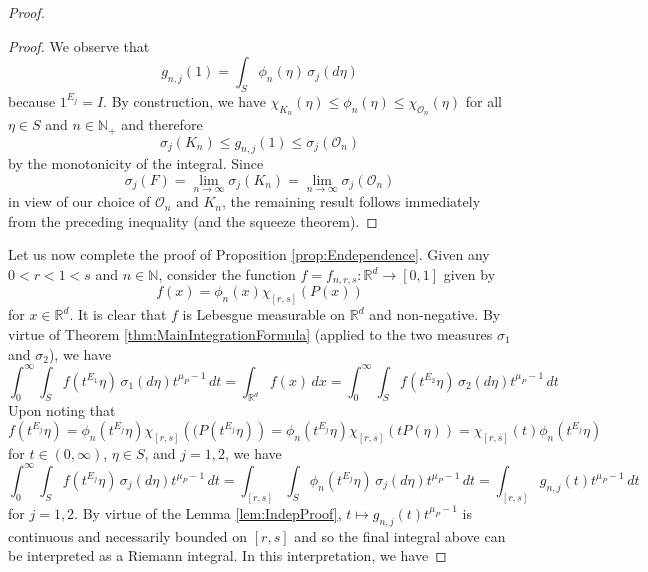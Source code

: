 \documentclass[11pt]{article}
\newcommand*{\myproofname}{Proof}
\newenvironment{subproof}[1][\myproofname]{\begin{proof}[#1]\renewcommand*{\qedsymbol}{$\mathbin{/\mkern-6mu/}$}}{\end{proof}}
\begin{document}
\begin{proof}
\begin{subproof}
We observe that
\begin{equation*}
g_{n,j}(1)=\int_{S}\phi_n(\eta)\,\sigma_j(d\eta)
\end{equation*}
because $1^{E_j}=I$. By construction, we have $\chi_{K_n}(\eta)\leq\phi_{n}(\eta)\leq \chi_{\mathcal{O}_n}(\eta)$ for all $\eta\in S$ and $n\in\mathbb{N}_+$ and therefore
\begin{equation*}
\sigma_j(K_n)\leq g_{n,j}(1)\leq \sigma_{j}(\mathcal{O}_n)
\end{equation*}
by the monotonicity of the integral. Since
\begin{equation*}
\sigma_j(F)=\lim_{n\to\infty}\sigma_j(K_n)=\lim_{n\to\infty}\sigma_j(\mathcal{O}_n)
\end{equation*}
in view of our choice of $\mathcal{O}_n$ and $K_n$, the remaining result follows immediately from the preceding inequality (and the squeeze theorem).
\end{subproof}
\noindent Let us now complete the proof of Proposition \ref{prop:Endependence}. Given any $0<r<1< s$ and $n\in\mathbb{N}$, consider the function $f=f_{n,r,s}:\mathbb{R}^d\to [0,1]$ given by
\begin{equation*}
f(x)=\phi_n(x)\chi_{[r,s]}(P(x))
\end{equation*}
for $x\in\mathbb{R}^d$. It is clear that $f$ is Lebesgue measurable on $\mathbb{R}^d$ and non-negative. By virtue of Theorem \ref{thm:MainIntegrationFormula} (applied to the two measures $\sigma_1$ and $\sigma_2$), we have
\begin{equation}\label{eq:SameMeasure1}
\int_0^\infty \int_Sf(t^{E_1}\eta)\,\sigma_1(d\eta)t^{\mu_P-1}\,dt=\int_{\mathbb{R}^d}f(x)\,dx=\int_0^\infty \int_Sf(t^{E_2}\eta)\,\sigma_2(d\eta)t^{\mu_P-1}\,dt
\end{equation}
Upon noting that
\begin{equation*}
f(t^{E_j}\eta)=\phi_n(t^{E_j}\eta)\chi_{[r,s]}\left((P(t^{E_j}\eta)\right)=\phi_n(t^{E_j}\eta)\chi_{[r,s]}(tP(\eta))=\chi_{[r,s]}(t)\phi_n(t^{E_j}\eta)
\end{equation*}
for $t\in (0,\infty)$, $\eta\in S$, and $j=1,2$, we have
\begin{equation*}
\int_0^\infty\int_S f(t^{E_j}\eta)\,\sigma_j(d\eta)t^{\mu_P-1}\,dt=\int_{[r,s]}\int_S\phi_n(t^{E_j}\eta)\,\sigma_j(d\eta) t^{\mu_P-1}\,dt=\int_{[r,s]}g_{n,j}(t)t^{\mu_P-1}\,dt
\end{equation*}
for $j=1,2$. By virtue of the Lemma \ref{lem:IndepProof}, $t\mapsto g_{n,j}(t)t^{\mu_P-1}$ is continuous and necessarily bounded on $[r,s]$ and so the final integral above can be interpreted as a Riemann integral. In this interpretation, we have

\end{proof}
\end{document}
